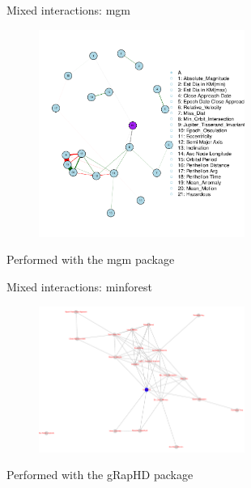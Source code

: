 \documentclass{beamer}
\begin{document}
\begin{frame}{Mixed interactions: mgm}
\begin{figure}[h]
\begin{center}
\includegraphics[width=0.6\textwidth]{Pic/mgm.pdf}
\label{mgm}
\end{center}
\end{figure}
\begin{center}
Performed with the mgm package \cite{haslbeck2015mgm}
\end{center}
\end{frame}

\begin{frame}{Mixed interactions: minforest}
\begin{figure}[h]
\begin{center}
\includegraphics[width=0.6\textwidth]{Pic/minforest.pdf}
\label{mgm}
\end{center}
\end{figure}
\begin{center}
Performed with the gRapHD package \cite{de2009high}
\end{center}
\end{frame}
\end{document}
